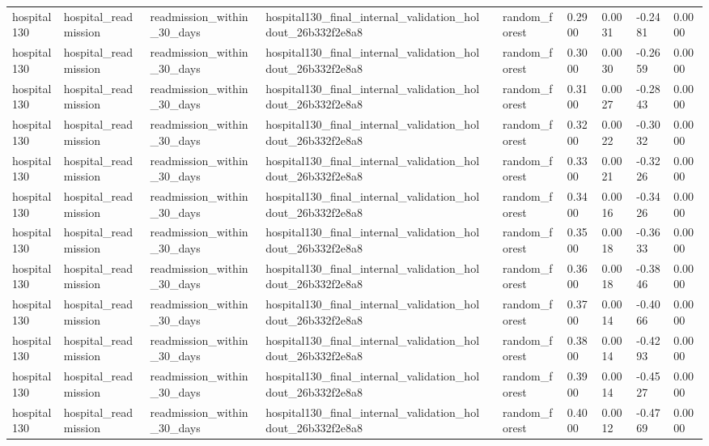 \begin{tabular}{llllllllll}
hospital130 & hospital\_readmission & readmission\_within\_30\_days & hospital130\_final\_internal\_validation\_holdout\_26b332f2e8a8 &  & random\_forest & 0.2900 & 0.0031 & -0.2481 & 0.0000 \\
hospital130 & hospital\_readmission & readmission\_within\_30\_days & hospital130\_final\_internal\_validation\_holdout\_26b332f2e8a8 &  & random\_forest & 0.3000 & 0.0030 & -0.2659 & 0.0000 \\
hospital130 & hospital\_readmission & readmission\_within\_30\_days & hospital130\_final\_internal\_validation\_holdout\_26b332f2e8a8 &  & random\_forest & 0.3100 & 0.0027 & -0.2843 & 0.0000 \\
hospital130 & hospital\_readmission & readmission\_within\_30\_days & hospital130\_final\_internal\_validation\_holdout\_26b332f2e8a8 &  & random\_forest & 0.3200 & 0.0022 & -0.3032 & 0.0000 \\
hospital130 & hospital\_readmission & readmission\_within\_30\_days & hospital130\_final\_internal\_validation\_holdout\_26b332f2e8a8 &  & random\_forest & 0.3300 & 0.0021 & -0.3226 & 0.0000 \\
hospital130 & hospital\_readmission & readmission\_within\_30\_days & hospital130\_final\_internal\_validation\_holdout\_26b332f2e8a8 &  & random\_forest & 0.3400 & 0.0016 & -0.3426 & 0.0000 \\
hospital130 & hospital\_readmission & readmission\_within\_30\_days & hospital130\_final\_internal\_validation\_holdout\_26b332f2e8a8 &  & random\_forest & 0.3500 & 0.0018 & -0.3633 & 0.0000 \\
hospital130 & hospital\_readmission & readmission\_within\_30\_days & hospital130\_final\_internal\_validation\_holdout\_26b332f2e8a8 &  & random\_forest & 0.3600 & 0.0018 & -0.3846 & 0.0000 \\
hospital130 & hospital\_readmission & readmission\_within\_30\_days & hospital130\_final\_internal\_validation\_holdout\_26b332f2e8a8 &  & random\_forest & 0.3700 & 0.0014 & -0.4066 & 0.0000 \\
hospital130 & hospital\_readmission & readmission\_within\_30\_days & hospital130\_final\_internal\_validation\_holdout\_26b332f2e8a8 &  & random\_forest & 0.3800 & 0.0014 & -0.4293 & 0.0000 \\
hospital130 & hospital\_readmission & readmission\_within\_30\_days & hospital130\_final\_internal\_validation\_holdout\_26b332f2e8a8 &  & random\_forest & 0.3900 & 0.0014 & -0.4527 & 0.0000 \\
hospital130 & hospital\_readmission & readmission\_within\_30\_days & hospital130\_final\_internal\_validation\_holdout\_26b332f2e8a8 &  & random\_forest & 0.4000 & 0.0012 & -0.4769 & 0.0000 \\

\end{tabular}
